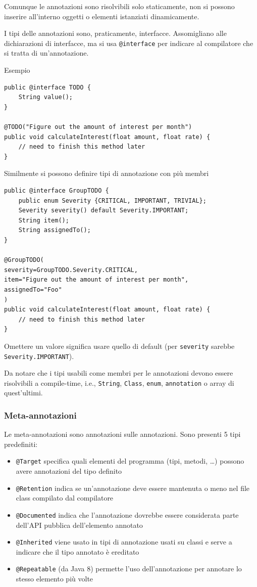 Comunque le annotazioni sono risolvibili solo staticamente, non si possono inserire all'interno oggetti o elementi istanziati dinamicamente.

I tipi delle annotazioni sono, praticamente, interfacce. Assomigliano alle dichiarazioni di interfacce, ma si usa \texttt{@interface} per indicare al compilatore che si tratta di un'annotazione.

Esempio
\begin{verbatim}
public @interface TODO {
    String value();
}

@TODO("Figure out the amount of interest per month")
public void calculateInterest(float amount, float rate) {
    // need to finish this method later
}
\end{verbatim}

Similmente si possono definire tipi di annotazione con più membri
\begin{verbatim}
public @interface GroupTODO {
    public enum Severity {CRITICAL, IMPORTANT, TRIVIAL};
    Severity severity() default Severity.IMPORTANT;
    String item();
    String assignedTo();
}

@GroupTODO(
severity=GroupTODO.Severity.CRITICAL,
item="Figure out the amount of interest per month",
assignedTo="Foo"
)
public void calculateInterest(float amount, float rate) {
    // need to finish this method later
}
\end{verbatim}

Omettere un valore significa usare quello di default (per \texttt{severity} sarebbe \texttt{Severity.IMPORTANT}).

Da notare che i tipi usabili come membri per le annotazioni devono essere risolvibili a compile-time, i.e., \texttt{String}, \texttt{Class}, \texttt{enum}, \texttt{annotation} o array di quest'ultimi.

\subsubsection{Meta-annotazioni}

Le meta-annotazioni sono annotazioni sulle annotazioni. Sono presenti 5 tipi predefiniti:
\begin{itemize}
    \item \texttt{@Target} specifica quali elementi del programma (tipi, metodi, \dots) possono avere annotazioni del tipo definito

    \item \texttt{@Retention} indica se un'annotazione deve essere mantenuta o meno nel file class compilato dal compilatore

    \item \texttt{@Documented} indica che l'annotazione dovrebbe essere considerata parte dell'API pubblica dell'elemento annotato

    \item \texttt{@Inherited} viene usato in tipi di annotazione usati su classi e serve a indicare che il tipo annotato è ereditato

    \item \texttt{@Repeatable} (da Java 8) permette l'uso dell'annotazione per annotare lo stesso elemento più volte
\end{itemize}

